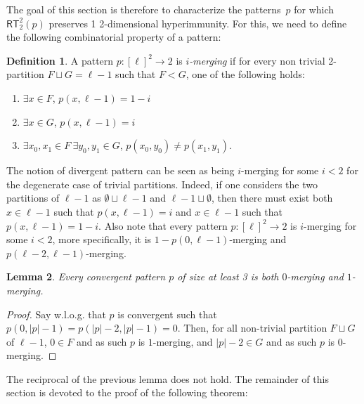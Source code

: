\documentclass{article}
\newcommand{\RT}[0]{\mathsf{RT}}
\newtheorem{theorem}{Theorem}
\numberwithin{theorem}{section}
\newtheorem{lemma}[theorem]{Lemma}
\theoremstyle{definition}
\newtheorem{definition}[theorem]{Definition}
\begin{document}
The goal of this section is therefore to characterize the patterns~$p$ for which $\RT^2_2(p)$ preserves 1 2-dimensional hyperimmunity. For this, we need to define the following combinatorial property of a pattern:


\begin{definition}
A pattern $p : [\ell]^2 \to 2$ is \emph{$i$-merging} if for every non trivial 2-partition $F \sqcup G = \ell-1$
such that $F < G$, one of the following holds:
\begin{enumerate}
    \item $\exists x \in F$, $p(x, \ell-1) = 1-i$
    \item $\exists x\in G$, $p(x, \ell-1) = i$
    \item $\exists x_0, x_1 \in F\ \exists y_0, y_1 \in G$, $p(x_0, y_0) \neq p(x_1, y_1)$.
\end{enumerate}
\end{definition}


The notion of divergent pattern can be seen as being $i$-merging for some $i<2$ for the degenerate case of trivial partitions. Indeed, 
if one considers the two partitions of $\ell-1$ as $\emptyset \sqcup \ell-1$ and $\ell-1 \sqcup \emptyset$, then there must exist both $x \in \ell-1$ such that $p(x, \ell-1) = i$ and $x \in \ell-1$ such that $p(x, \ell-1) = 1-i$.
Also note that every pattern $p : [\ell]^2 \to 2$  is $i$-merging for some $i<2$, more specifically, it is $1-p(0,\ell-1)$-merging and $p(\ell-2,\ell-1)$-merging.

\begin{lemma}
    Every convergent pattern $p$ of size at least 3 is both $0$-merging and $1$-merging.
\end{lemma}

\begin{proof}
    Say w.l.o.g. that $p$ is convergent such that $p(0,|p|-1)=p(|p|-2,|p|-1)=0$. Then, for all non-trivial partition $F \sqcup G$ of $\ell-1$, $0 \in F$ and as such $p$ is $1$-merging, and $|p|-2 \in G$ and as such $p$ is $0$-merging.
\end{proof}

The reciprocal of the previous lemma does not hold.
The remainder of this section is devoted to the proof of the following theorem:

\end{document}
